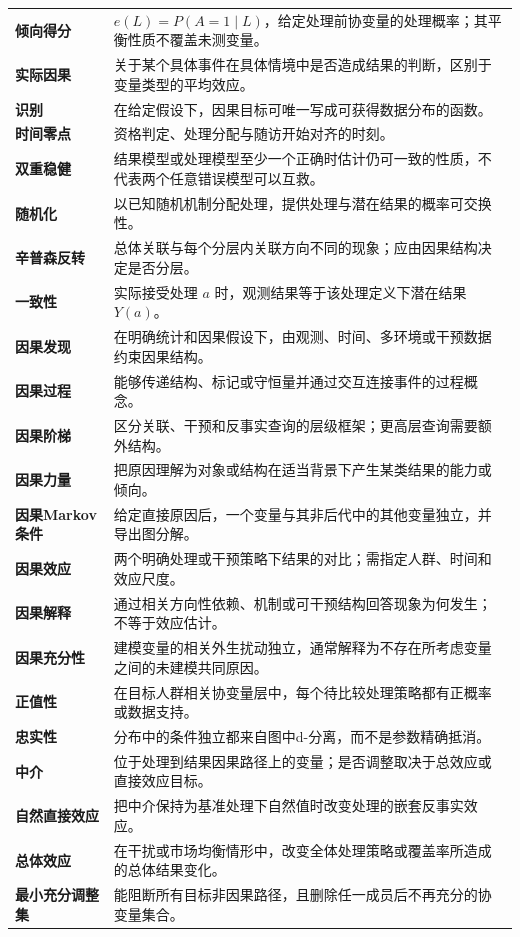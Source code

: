 \begin{longtable}{>{\bfseries}p{}p{}}
倾向得分 & $e(L)=P(A=1\mid L)$，给定处理前协变量的处理概率；其平衡性质不覆盖未测变量。\\
实际因果 & 关于某个具体事件在具体情境中是否造成结果的判断，区别于变量类型的平均效应。\\
识别 & 在给定假设下，因果目标可唯一写成可获得数据分布的函数。\\
时间零点 & 资格判定、处理分配与随访开始对齐的时刻。\\
双重稳健 & 结果模型或处理模型至少一个正确时估计仍可一致的性质，不代表两个任意错误模型可以互救。\\
随机化 & 以已知随机机制分配处理，提供处理与潜在结果的概率可交换性。\\
辛普森反转 & 总体关联与每个分层内关联方向不同的现象；应由因果结构决定是否分层。\\
一致性 & 实际接受处理 $a$ 时，观测结果等于该处理定义下潜在结果 $Y(a)$。\\
因果发现 & 在明确统计和因果假设下，由观测、时间、多环境或干预数据约束因果结构。\\
因果过程 & 能够传递结构、标记或守恒量并通过交互连接事件的过程概念。\\
因果阶梯 & 区分关联、干预和反事实查询的层级框架；更高层查询需要额外结构。\\
因果力量 & 把原因理解为对象或结构在适当背景下产生某类结果的能力或倾向。\\
因果Markov条件 & 给定直接原因后，一个变量与其非后代中的其他变量独立，并导出图分解。\\
因果效应 & 两个明确处理或干预策略下结果的对比；需指定人群、时间和效应尺度。\\
因果解释 & 通过相关方向性依赖、机制或可干预结构回答现象为何发生；不等于效应估计。\\
因果充分性 & 建模变量的相关外生扰动独立，通常解释为不存在所考虑变量之间的未建模共同原因。\\
正值性 & 在目标人群相关协变量层中，每个待比较处理策略都有正概率或数据支持。\\
忠实性 & 分布中的条件独立都来自图中d-分离，而不是参数精确抵消。\\
中介 & 位于处理到结果因果路径上的变量；是否调整取决于总效应或直接效应目标。\\
自然直接效应 & 把中介保持为基准处理下自然值时改变处理的嵌套反事实效应。\\
总体效应 & 在干扰或市场均衡情形中，改变全体处理策略或覆盖率所造成的总体结果变化。\\
最小充分调整集 & 能阻断所有目标非因果路径，且删除任一成员后不再充分的协变量集合。\\
\bottomrule
\end{longtable}
\normalsize

